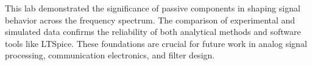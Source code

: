 \documentclass[12pt]{article}
\begin{document}
This lab demonstrated the significance of passive components in shaping signal behavior across the frequency spectrum. The comparison of experimental and simulated data confirms the reliability of both analytical methods and software tools like LTSpice. These foundations are crucial for future work in analog signal processing, communication electronics, and filter design.
\end{document}

